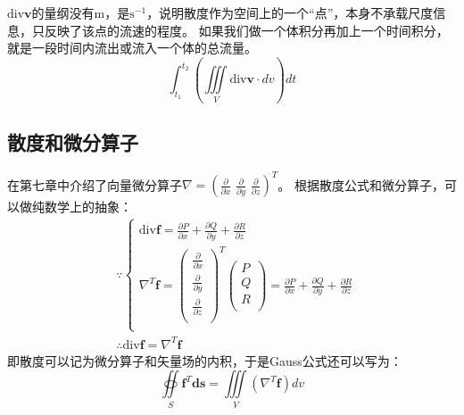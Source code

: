 $\mathrm{div}\boldsymbol{v}$的量纲没有$\mathrm{m}$，是$\mathrm{s}^{-1}$，说明散度作为空间上的一个“点”，本身不承载尺度信息，只反映了该点的流速的程度。
如果我们做一个体积分再加上一个时间积分，就是一段时间内流出或流入一个体的总流量。
\[
\int_{t_1}^{t_2}{\left( \iiint\limits_V{\mathrm{div}\boldsymbol{v}\cdot dv} \right) dt}
\]

\subsection{散度和微分算子}

在第七章中介绍了向量微分算子$\nabla =\left( \frac{\partial}{\partial x}\,\,\frac{\partial}{\partial y}\,\,\frac{\partial}{\partial z} \right) ^T$。
根据散度公式和微分算子，可以做纯数学上的抽象：
\begin{align*}
&\because \begin{cases}
	\mathrm{div}\boldsymbol{f}=\frac{\partial P}{\partial x}+\frac{\partial Q}{\partial y}+\frac{\partial R}{\partial z}\\
	\nabla ^T\boldsymbol{f}=\left( \begin{array}{c}
	\frac{\partial}{\partial x}\\
	\frac{\partial}{\partial y}\\
	\frac{\partial}{\partial z}\\
\end{array} \right) ^T\left( \begin{array}{c}
	P\\
	Q\\
	R\\
\end{array} \right) =\frac{\partial P}{\partial x}+\frac{\partial Q}{\partial y}+\frac{\partial R}{\partial z}\\
\end{cases} \\
&\therefore \mathrm{div}\boldsymbol{f}=\nabla ^T\boldsymbol{f}
\end{align*}
即散度可以记为微分算子和矢量场的内积，于是Gauss公式还可以写为：
\[
\oiint\limits_S{\boldsymbol{f}^T\boldsymbol{ds}}=\iiint\limits_V{\left( \nabla ^T\boldsymbol{f} \right) dv}
\]




